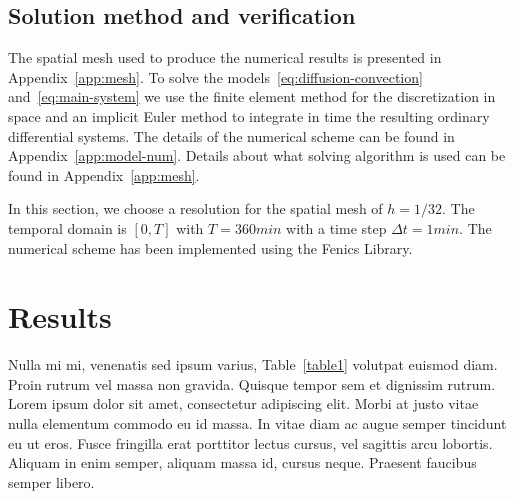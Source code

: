 \documentclass[10pt,letterpaper]{article}
\newcommand{\1}{^{(1)}}
\newcommand{\2}{^{(2)}}
\newcommand {\dt}   {\Delta t}
\begin{document}
\subsection{Solution method and verification}

The spatial mesh used to produce the numerical results is presented in Appendix~\ref{app:mesh}. 
To solve the models~\eqref{eq:diffusion-convection} and~\eqref{eq:main-system} we use the finite element method for the discretization in space and an implicit Euler method to integrate in time the resulting ordinary differential systems. The details of the numerical scheme can be found in Appendix~\ref{app:model-num}. 
Details about what solving algorithm is used can be found in Appendix~\ref{app:mesh}.

In this section, we choose a resolution for the spatial mesh of $h=1/32$. The temporal domain is $[0,T]$ with $T=360 \si{min}$ with a time step $\dt = 1 \si{min}$. 
The numerical scheme has been implemented using the Fenics Library\cite{alnaes2015fenics,LoggMardalEtAl2012}. 







\section*{Results}
Nulla mi mi, venenatis sed ipsum varius, Table~\ref{table1} volutpat euismod diam. Proin rutrum vel massa non gravida. Quisque tempor sem et dignissim rutrum. Lorem ipsum dolor sit amet, consectetur adipiscing elit. Morbi at justo vitae nulla elementum commodo eu id massa. In vitae diam ac augue semper tincidunt eu ut eros. Fusce fringilla erat porttitor lectus cursus, vel sagittis arcu lobortis. Aliquam in enim semper, aliquam massa id, cursus neque. Praesent faucibus semper libero.
\end{document}
